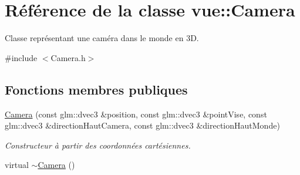 \hypertarget{classvue_1_1_camera}{\section{Référence de la classe vue\-:\-:Camera}
\label{classvue_1_1_camera}
}


Classe représentant une caméra dans le monde en 3\-D.  




{\ttfamily \#include $<$Camera.\-h$>$}

\subsection*{Fonctions membres publiques}
\begin{DoxyCompactItemize}
\item 
\hyperlink{classvue_1_1_camera_a0c7869e1153f216e88fc15eb5ac37ce4}{Camera} (const glm\-::dvec3 \&position, const glm\-::dvec3 \&point\-Vise, const glm\-::dvec3 \&direction\-Haut\-Camera, const glm\-::dvec3 \&direction\-Haut\-Monde)
\begin{DoxyCompactList}\small\item\em Constructeur à partir des coordonnées cartésiennes. \end{DoxyCompactList}\item 
\hypertarget{classvue_1_1_camera_a173cf3a9d91b30cadd21d72149df4504}{virtual \hyperlink{classvue_1_1_camera_a173cf3a9d91b30cadd21d72149df4504}{$\sim$\-Camera} ()}\label{classvue_1_1_camera_a173cf3a9d91b30cadd21d72149df4504}


\end{DoxyCompactItemize}
